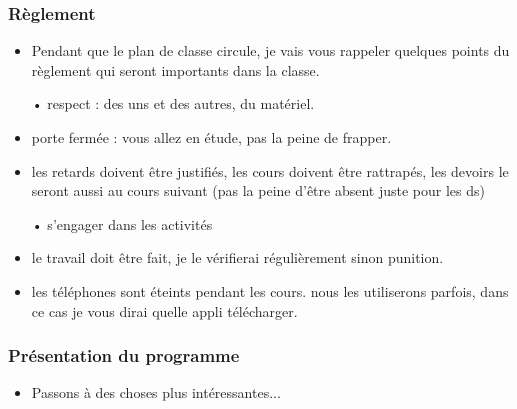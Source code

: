 \subsubsection*{Règlement}
\begin{itemize}
\item \og Pendant que le plan de classe circule, je vais vous rappeler quelques points du règlement qui seront importants dans la classe.\fg{}
\item[•] respect : des uns et des autres, du matériel.
\item porte fermée : vous allez en étude, pas la peine de frapper.
\item les retards doivent être justifiés, les cours doivent être rattrapés, les devoirs le seront aussi au cours suivant (pas la peine d'être absent juste pour les ds)
\item[•] s'engager dans les activités
\item le travail doit être fait, je le vérifierai régulièrement sinon punition.
\item les téléphones sont éteints pendant les cours. nous les utiliserons parfois, dans ce cas je vous dirai quelle appli télécharger.
\end{itemize}

\subsubsection*{Présentation du programme}
\begin{itemize}
\item \og Passons à des choses plus intéressantes... \fg{} 
\end{itemize}

